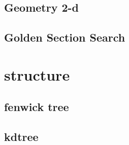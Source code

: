 \documentclass[dvipdfmx, 11pt]{jsarticle}
\begin{document}
\subsection{Geometry 2-d}


\subsection{Golden Section Search}



\section{structure}

\subsection{fenwick tree}


\subsection{kdtree}

\end{document}
